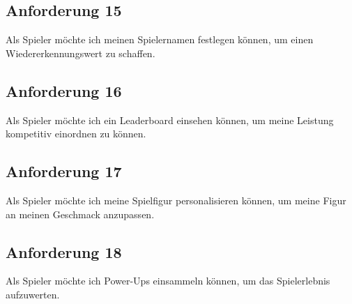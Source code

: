 \documentclass[conference]{IEEEtran}
\begin{document}
\subsection{Anforderung 15}
Als Spieler möchte ich meinen Spielernamen festlegen können, um einen Wiedererkennungswert zu schaffen.

\subsection{Anforderung 16}
Als Spieler möchte ich ein Leaderboard einsehen können, um meine Leistung kompetitiv einordnen zu können.

\subsection{Anforderung 17}
Als Spieler möchte ich meine Spielfigur personalisieren können, um meine Figur an meinen Geschmack anzupassen.

\subsection{Anforderung 18}
Als Spieler möchte ich Power-Ups einsammeln können, um das Spielerlebnis aufzuwerten.
\end{document}
